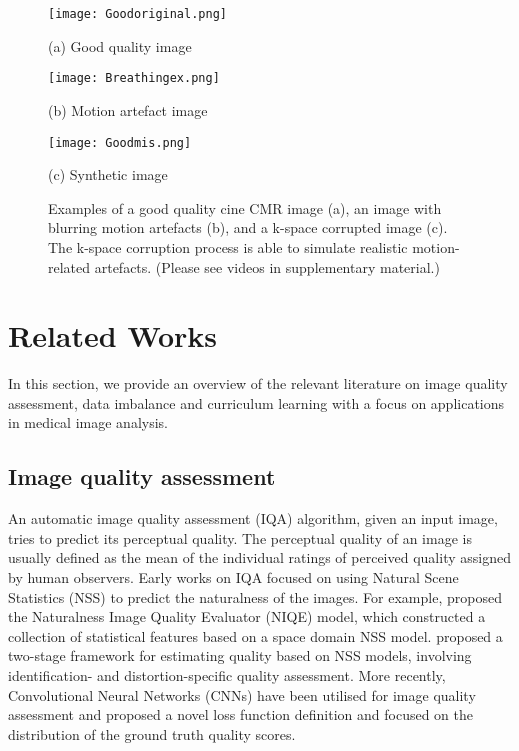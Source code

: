 \documentclass[preprint,12pt,authoryear]{elsarticle}
\begin{document}
 \begin{figure}[tb]

\begin{minipage}[b]{0.31\linewidth}
  \centering
  \centerline{\texttt{[image: Goodoriginal.png]}}
  \centerline{(a) Good quality image}\medskip
  \label{fig:Motivationa}
\end{minipage}
\hfill
\begin{minipage}[b]{0.31\linewidth}
  \centering
  \centerline{\texttt{[image: Breathingex.png]}}
  \centerline{(b) Motion artefact image}\medskip
  \label{fig:Motivationb}
\end{minipage}
\hfill
\begin{minipage}[b]{0.31\linewidth}
  \centering
  \centerline{\texttt{[image: Goodmis.png]}}
  \centerline{ (c) Synthetic image} \medskip
  \label{fig:Motivationc}
\end{minipage}
\hfill

\caption{Examples of a good quality cine CMR image (a), an image with blurring motion artefacts (b), and a k-space corrupted image (c). The k-space corruption process is able to simulate realistic motion-related artefacts. (Please see videos in supplementary material.)}
\label{fig:Mot}
\end{figure}








\section{Related Works}
\label{sec:Related}

In this section, we provide an overview of the relevant literature on image quality assessment, data imbalance and curriculum learning with a focus on applications in medical image analysis.

\subsection{Image quality assessment}
\label{sec:imq}

An automatic image quality assessment (IQA) algorithm, given an input image, tries to predict its perceptual quality. The perceptual quality of an image is usually defined as the mean of the individual ratings of perceived quality assigned by human observers.
Early works on IQA focused on using Natural Scene Statistics (NSS) to predict the naturalness of the images. For example, \cite{Mittal2013} proposed the Naturalness Image Quality Evaluator (NIQE) model, which constructed a collection of statistical features based on a space domain NSS model.
\cite{Moorthy2011} proposed a two-stage framework for estimating quality based on NSS models, involving identification- and distortion-specific quality assessment. More recently, Convolutional Neural Networks (CNNs) have been utilised for image quality assessment \citep{Kang2014} and \cite{Talebi2018} proposed a novel loss function definition and focused on the distribution of the ground truth quality scores.\\
\end{document}
